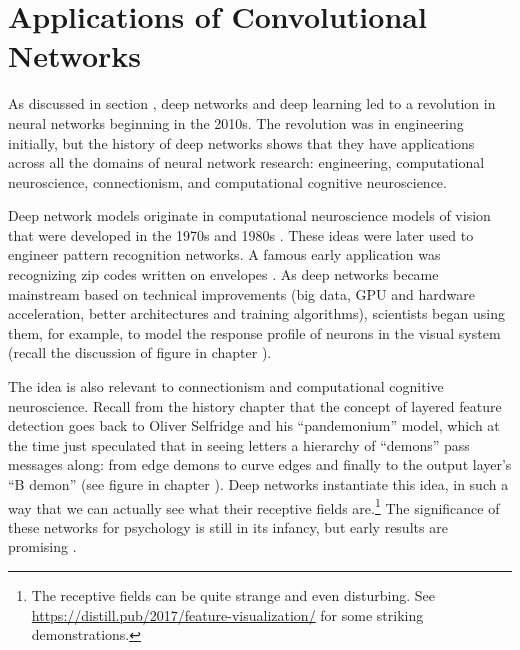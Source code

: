 \section{Applications of Convolutional Networks}

 
As discussed in section , deep networks and deep learning led to a revolution in neural networks beginning in the 2010s. The revolution was in engineering initially, but the history of deep networks shows that they have applications across all the domains of neural network research: engineering, computational neuroscience, connectionism, and computational cognitive neuroscience. 

Deep network models originate in  computational neuroscience models of vision that were developed in the 1970s and 1980s \cite{fukushima1982neocognitron}. These ideas were later used to engineer pattern recognition networks. A famous early application was recognizing zip codes written on envelopes \cite{lecun1989backpropagation}. As deep networks became mainstream based on technical improvements (big data, GPU and hardware acceleration, better architectures and training algorithms), scientists began using them, for example, to model the response profile of neurons in the visual system (recall the discussion of figure  in chapter ). 

The idea is also relevant to connectionism and computational cognitive neuroscience. Recall from the history chapter that the concept of layered feature detection goes back to Oliver Selfridge and his ``pandemonium'' model, which at the time just speculated that in seeing letters a hierarchy of ``demons'' pass messages along: from edge demons to curve edges and finally to the output layer's ``B demon'' (see figure  in chapter ). Deep networks instantiate this idea, in such a way that we can actually  see what their receptive fields are.\footnote{The receptive fields can be quite strange and even disturbing. See \url{https://distill.pub/2017/feature-visualization/} for some striking demonstrations.}  The significance of these networks for psychology is still in its infancy, but early results are promising \cite{zorzi2013modeling, ritter2017cognitive}.
